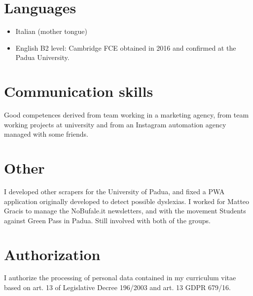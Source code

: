 \documentclass[a4paper,icon]{twentysecondcv}
\begin{document}

\section{Languages}

\begin{itemize}
    \item Italian (mother tongue)
    \item English B2 level: Cambridge FCE obtained in 2016 and confirmed at the Padua University.
\end{itemize}



\section{Communication skills}

Good competences derived from team working in a marketing agency, from team working projects at university and from an Instagram automation agency managed with some friends.

\section{Other}

I developed other scrapers for the University of Padua, and fixed a PWA application originally developed to detect possible dyslexias.
I worked for Matteo Gracis to manage the NoBufale.it newsletters, and with the movement Students against Green Pass in Padua. Still involved with both of the groups.

\section{Authorization}

I authorize the processing of personal data contained in my curriculum vitae
based on art. 13 of Legislative Decree 196/2003 and art. 13 GDPR 679/16.
\end{document}
